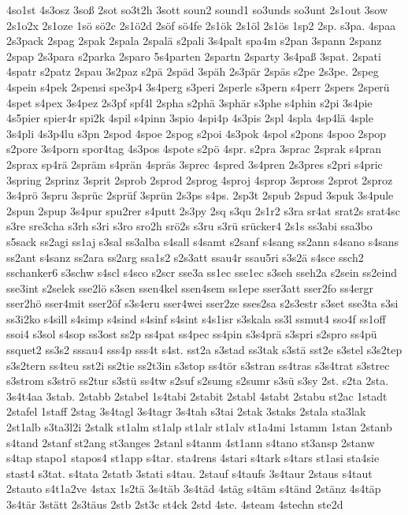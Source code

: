 {4so1st
4s3osz
3soß
2sot
so3t2h
3sott
soun2
sound1
so3unds
so3unt
2s1out
3sow
2s1o2x
2s1oze
1sö
sö2c
2s1ö2d
2söf
sö4fe
2s1ök
2s1öl
2s1ös
1sp2
2sp.
s3pa.
4spaa
2s3pack
2spag
2spak
2spala
2spalä
s2pali
3s4palt
spa4m
s2pan
3spann
2spanz
2spap
2s3para
s2parka
2sparo
5s4parten
2spartn
2sparty
3s4paß
3spat.
2spati
4spatr
s2patz
2spau
3s2paz
s2pä
2späd
3späh
2s3pär
2späs
s2pe
2s3pe.
2speg
4spein
s4pek
2spensi
spe3p4
3s4perg
s3peri
2sperle
s3pern
s4perr
2spers
2sperü
4spet
s4pex
3s4pez
2s3pf
spf4l
2spha
s2phä
3sphär
s3phe
s4phin
s2pi
3s4pie
4s5pier
spier4r
spi2k
4spil
s4pinn
3spio
4spi4p
4s3pis
2spl
4spla
4sp4lä
4sple
3s4pli
4s3p4lu
s3pn
2spod
4spoe
2spog
s2poi
4s3pok
4spol
s2pons
4spoo
2spop
s2pore
3s4porn
spor4tag
4s3pos
4spote
s2pö
4spr.
s2pra
3sprac
2sprak
s4pran
2sprax
sp4rä
2spräm
s4prän
4spräs
3sprec
4spred
3s4pren
2s3pres
s2pri
s4pric
3spring
2sprinz
3sprit
2sprob
2sprod
2sprog
4sproj
4sprop
3spross
2sprot
2sproz
3s4prö
3spru
3sprüc
2sprüf
3sprün
2s3ps
s4ps.
2sp3t
2spub
2spud
3spuk
3s4pule
2spun
2spup
3s4pur
spu2rer
s4putt
2s3py
2sq
s3qu
2s1r2
s3ra
sr4at
srat2s
srat4sc
s3re
sre3cha
s3rh
s3ri
s3ro
sro2h
srö2s
s3ru
s3rü
srücker4
2s1s
ss3abi
ssa3bo
s5sack
ss2agi
ss1aj
s3sal
ss3alba
s4sall
s4samt
s2sanf
s4sang
ss2ann
s4sano
s4sans
ss2ant
s4sanz
ss2ara
ss2arg
ssa1s2
s2s3att
ssau4r
ssau5ri
s3s2ä
s4sce
ssch2
sschanker6
s3schw
s4scl
s4sco
s2scr
sse3a
ss1ec
sse1ec
s3seh
sseh2a
s2sein
ss2eind
sse3int
s2selek
sse2lö
s3sen
ssen4kel
ssen4sem
ss1epe
sser3att
sser2fo
ss4ergr
sser2hö
sser4mit
sser2öf
s3s4eru
sser4wei
sser2ze
sses2sa
s2s3estr
s3set
sse3ta
s3si
ss3i2ko
s4sill
s4simp
s4sind
s4sinf
s4sint
s4s1isr
s3skala
ss3l
ssmut4
sso4f
ss1off
ssoi4
s3sol
s4sop
ss3ost
ss2p
ss4pat
ss4pec
ss4pin
s3s4prä
s3spri
s2spro
ss4pü
ssquet2
ss3s2
sssau4
sss4p
sss4t
s4st.
sst2a
s3stad
ss3tak
s3stä
sst2e
s3stel
s3s2tep
s3s2tern
ss4teu
sst2i
ss2tie
ss2t3in
s3stop
ss4tör
s3stran
ss4tras
s3s4trat
s3strec
s3strom
s3strö
ss2tur
s3stü
ss4tw
s2suf
s2sumg
s2sumr
s3sü
s3sy
2st.
s2ta
2sta.
3s4t4aa
3stab.
2stabb
2stabel
1s4tabi
2stabit
2stabl
4stabt
2stabu
st2ac
1stadt
2stafel
1staff
2stag
3s4tagl
3s4tagr
3s4tah
s3tai
2stak
3staks
2stala
sta3lak
2st1alb
s3ta3l2i
2stalk
st1alm
st1alp
st1alr
st1alv
st1a4mi
1stamm
1stan
2stanb
s4tand
2stanf
st2ang
st3anges
2stanl
s4tanm
4st1ann
s4tano
st3ansp
2stanw
s4tap
stapo1
stapos4
st1app
s4tar.
sta4rens
4stari
s4tark
s4tars
st1asi
sta4sie
stast4
s3tat.
s4tata
2statb
3stati
s4tau.
2stauf
s4taufs
3s4taur
2staus
s4taut
2stauto
s4t1a2ve
4stax
1s2tä
3s4täb
3s4täd
4stäg
s4täm
s4tänd
2stänz
4s4täp
3s4tär
3stätt
2s3täus
2stb
2st3c
st4ck
2std
4ste.
4steam
4stechn
ste2d
}
